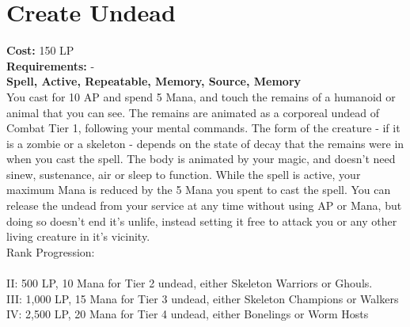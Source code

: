 \section{Create Undead}\label{spell:createUndead}
\textbf{Cost:} 150 LP\\
\textbf{Requirements:} -\\
\textbf{Spell, Active, Repeatable, Memory, Source, Memory}\\
You cast for 10 AP and spend 5 Mana, and touch the remains of a humanoid or animal that you can see.
The remains are animated as a corporeal undead of Combat Tier 1, following your mental commands.
The form of the creature - if it is a zombie or a skeleton - depends on the state of decay that the remains were in when you cast the spell.
The body is animated by your magic, and doesn't need sinew, sustenance, air or sleep to function.
While the spell is active, your maximum Mana is reduced by the 5 Mana you spent to cast the spell.
You can release the undead from your service at any time without using AP or Mana, but doing so doesn't end it's unlife, instead setting it free to attack you or any other living creature in it's vicinity.
\\
Rank Progression:\\
\\
II: 500 LP, 10 Mana for Tier 2 undead, either Skeleton Warriors or Ghouls.\\
III: 1,000 LP, 15 Mana for Tier 3 undead, either Skeleton Champions or Walkers\\
IV: 2,500 LP, 20 Mana for Tier 4 undead, either Bonelings or Worm Hosts\\
